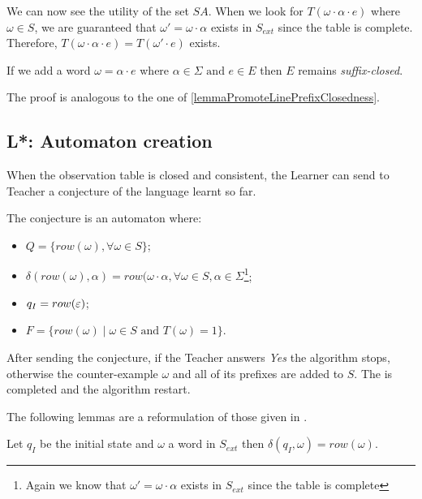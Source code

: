 We can now see the utility of the set $SA$. When we look for $T(\omega \cdot \alpha \cdot e)$ where $\omega \in S$, we are guaranteed that $\omega' = \omega \cdot \alpha$ exists in $S_{ext}$ since the table is complete. Therefore, $T(\omega \cdot \alpha \cdot e) = T(\omega' \cdot e)$ exists.

\begin{lemma}
  If we add a word $\omega = \alpha \cdot e$ where $\alpha \in \Sigma \text{ and } e \in E$ then $E$ remains \textit{suffix-closed}.
\end{lemma}

The proof is analogous to the one of \cref{lemmaPromoteLinePrefixClosedness}.

\subsection{L*: Automaton creation}

When the observation table is closed and consistent, the Learner can send to Teacher a conjecture of the language learnt so far.

The conjecture is an automaton where:
\begin{itemize}
  \item $Q = \{row(\omega), \forall \omega \in S\}$;
  \item $\delta(row(\omega), \alpha) = row(\omega \cdot \alpha, \forall \omega \in S, \alpha \in \Sigma$\footnote{Again we know that $\omega' = \omega\cdot\alpha$ exists in $S_{ext}$ since the table is complete };
  \item $q_I = row(\varepsilon)$;
  \item $F = \{row(\omega) \mid \omega \in S \text{ and } T(\omega) = 1 \}$.
\end{itemize}

After sending the conjecture, if the Teacher answers \textit{Yes} the algorithm stops, otherwise the counter-example $\omega$ and all of its prefixes are added to $S$. The \OT is completed and the algorithm restart.

The following lemmas are a reformulation of those given in \cite{LPaper}.

\begin{lemma}
  \label{lemma:L_trans_from_QI}
  Let $q_I$ be the initial state and $\omega$ a word in $S_{ext}$ then $\delta(q_I, \omega) = row(\omega)$.
\end{lemma}

